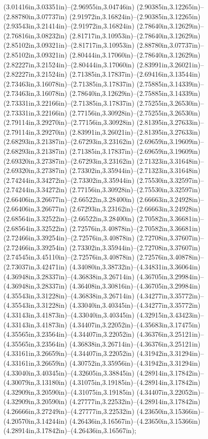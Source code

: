 (3.01416in,3.03351in)--(2.96955in,3.04746in) (2.90385in,3.12265in)--(2.88780in,3.07737in) (2.91972in,3.16824in)--(2.90385in,3.12265in) (2.93543in,3.21414in)--(2.91972in,3.16824in) (2.78640in,3.12629in)--(2.76816in,3.08232in) (2.81717in,3.10953in)--(2.78640in,3.12629in) (2.85102in,3.09321in)--(2.81717in,3.10953in) (2.88780in,3.07737in)--(2.85102in,3.09321in) (2.80444in,3.17060in)--(2.78640in,3.12629in) (2.82227in,3.21524in)--(2.80444in,3.17060in) (2.83991in,3.26021in)--(2.82227in,3.21524in) (2.71385in,3.17837in)--(2.69416in,3.13544in) (2.73463in,3.16078in)--(2.71385in,3.17837in) (2.75885in,3.14339in)--(2.73463in,3.16078in) (2.78640in,3.12629in)--(2.75885in,3.14339in) (2.73331in,3.22166in)--(2.71385in,3.17837in) (2.75255in,3.26530in)--(2.73331in,3.22166in) (2.77156in,3.30928in)--(2.75255in,3.26530in) (2.79114in,3.29270in)--(2.77156in,3.30928in) (2.81395in,3.27633in)--(2.79114in,3.29270in) (2.83991in,3.26021in)--(2.81395in,3.27633in) (2.68293in,3.21387in)--(2.67293in,3.23162in) (2.69659in,3.19609in)--(2.68293in,3.21387in) (2.71385in,3.17837in)--(2.69659in,3.19609in) (2.69320in,3.27387in)--(2.67293in,3.23162in) (2.71323in,3.31648in)--(2.69320in,3.27387in) (2.73302in,3.35944in)--(2.71323in,3.31648in) (2.74244in,3.34272in)--(2.73302in,3.35944in) (2.75530in,3.32597in)--(2.74244in,3.34272in) (2.77156in,3.30928in)--(2.75530in,3.32597in) (2.66406in,3.26677in)--(2.66522in,3.28400in) (2.66663in,3.24928in)--(2.66406in,3.26677in) (2.67293in,3.23162in)--(2.66663in,3.24928in) (2.68564in,3.32522in)--(2.66522in,3.28400in) (2.70582in,3.36681in)--(2.68564in,3.32522in) (2.72576in,3.40878in)--(2.70582in,3.36681in) (2.72466in,3.39254in)--(2.72576in,3.40878in) (2.72708in,3.37607in)--(2.72466in,3.39254in) (2.73302in,3.35944in)--(2.72708in,3.37607in) (2.74545in,3.45110in)--(2.72576in,3.40878in) (2.72576in,3.40878in)--(2.73037in,3.42471in) (4.34080in,3.38732in)--(4.34831in,3.36064in) (4.36948in,3.28337in)--(4.36838in,3.26714in) (4.36705in,3.29984in)--(4.36948in,3.28337in) (4.36408in,3.30816in)--(4.36705in,3.29984in) (4.35543in,3.31228in)--(4.36838in,3.26714in) (4.34277in,3.35772in)--(4.35543in,3.31228in) (4.33040in,3.40345in)--(4.34277in,3.35772in) (4.33143in,3.41873in)--(4.33040in,3.40345in) (4.32915in,3.43423in)--(4.33143in,3.41873in) (4.34407in,3.22052in)--(4.35683in,3.17475in) (4.35565in,3.23564in)--(4.34407in,3.22052in) (4.36376in,3.25121in)--(4.35565in,3.23564in) (4.36838in,3.26714in)--(4.36376in,3.25121in) (4.33161in,3.26659in)--(4.34407in,3.22052in) (4.31942in,3.31294in)--(4.33161in,3.26659in) (4.30752in,3.35956in)--(4.31942in,3.31294in) (4.33040in,3.40345in)--(4.32605in,3.38845in) (4.28914in,3.17842in)--(4.30079in,3.13180in) (4.31075in,3.19185in)--(4.28914in,3.17842in) (4.32909in,3.20590in)--(4.31075in,3.19185in) (4.34407in,3.22052in)--(4.32909in,3.20590in) (4.27777in,3.22532in)--(4.28914in,3.17842in) (4.26666in,3.27249in)--(4.27777in,3.22532in) (4.23650in,3.15366in)--(4.20570in,3.14244in) (4.26436in,3.16567in)--(4.23650in,3.15366in) (4.28914in,3.17842in)--(4.26436in,3.16567in);
